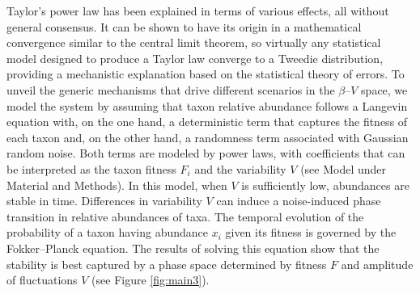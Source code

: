 Taylor's power law has been explained in terms of various effects, all without general consensus. It can be shown to have its origin in a mathematical convergence similar to the central limit theorem, so virtually any statistical model designed to produce a Taylor law converge to a Tweedie distribution\cite{stat}, providing a mechanistic explanation based on the statistical theory of errors\cite{convergence1,convergence2,convergence3}. To unveil the generic mechanisms that drive different scenarios in the $\beta$--$V$ space, we model the system by assuming that taxon relative abundance follows a Langevin equation with, on the one hand, a deterministic term that captures the fitness of each taxon and, on the other hand, a randomness term associated with Gaussian random noise\cite{ranking}. Both terms are modeled by power laws, with coefficients that can be interpreted as the taxon fitness $F_i$ and the variability $V$ (see Model under Material and Methods). In this model, when $V$ is sufficiently low, abundances are stable in time. Differences in variability $V$ can induce a noise-induced phase transition in relative abundances of taxa. The temporal evolution of the probability of a taxon having abundance $x_i$ given its fitness is governed by the Fokker--Planck equation. The results of solving this equation show that the stability is best captured by a phase space determined by fitness $F$ and amplitude of fluctuations $V$ (see Figure \ref{fig:main3}). 

